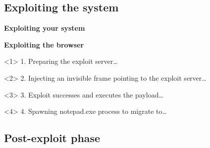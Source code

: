 \subsection{Exploiting the system}

\begin{frame}[plain]
    \begin{center}
      \Huge\bfseries
      Exploiting your system
    \end{center}
\end{frame}

\begin{frame}[plain]
  \begin{center}
    \LARGE\bfseries
    Exploiting the browser
  \end{center}

  \vspace{.5cm}

  \begin{onlyenv}<1>
    1. Preparing the exploit server\ldots
    \begin{center}
    \end{center}
  \end{onlyenv}

  \begin{onlyenv}<2>
    2. Injecting an invisible frame pointing to the exploit server\ldots
    \begin{center}
    \end{center}
  \end{onlyenv}

  \begin{onlyenv}<3>
    3. Exploit successes and executes the payload\ldots
    \begin{center}
    \end{center}
  \end{onlyenv}

  \begin{onlyenv}<4>
    4. Spawning notepad.exe process to migrate to\ldots
    \begin{center}
    \end{center}
  \end{onlyenv}

\end{frame}

\subsection{Post-exploit phase}

